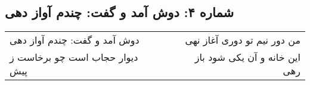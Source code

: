 \begin{center}
\section*{شماره ۴: دوش آمد و گفت: چندم آواز دهی}
\label{sec:004}
\begin{longtable}{l p{0.5cm} r}
دوش آمد و گفت: چندم آواز دهی
&&
من دور نیم تو دوری آغاز نهی
\\
دیوار حجاب است چو برخاست ز پیش
&&
این خانه و آن یکی شود باز رهی
\\
\end{longtable}
\end{center}
